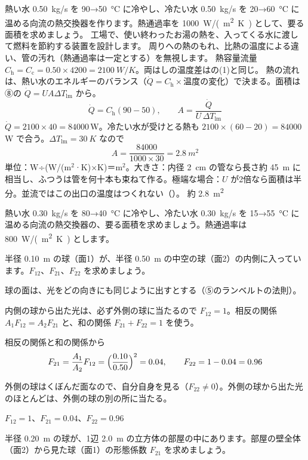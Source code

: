 \begin{phreidai}[熱交換器の面積を決める]
\label{ph:熱-13:ex11}熱い水 \qty{0.50}{kg/s} を 90→\qty{50}{\celsius} に冷やし、冷たい水 \qty{0.50}{kg/s} を 20→\qty{60}{\celsius} に温める向流の熱交換器を作ります。熱通過率を \qty{1000}{W/(m^2.K)} として、要る面積を求めましょう。
\phbamen
工場で、使い終わったお湯の熱を、入ってくる水に渡して燃料を節約する装置を設計します。
\phmushi
周りへの熱のもれ、比熱の温度による違い、管の汚れ（熱通過率は一定とする）を無視します。
\phzu
熱容量流量 $C_{\mathrm h}=C_{\mathrm c}=0.50\times4200=\qty{2100}{W/K}$。両はしの温度差はの(1)と同じ。
\phriyu
熱の流れは、熱い水のエネルギーのバランス（$\dot Q=C_{\mathrm h}\times$温度の変化）で決まる。面積は ⑧の $\dot Q=UA\Delta T_{\mathrm{lm}}$ から。
\phtateru
\[ \dot Q=C_{\mathrm h}(90-50),\qquad A=\frac{\dot Q}{U\,\Delta T_{\mathrm{lm}}} \]
\phtoku
$\dot Q=2100\times40=\num{84000}$\,W。冷たい水が受けとる熱も $2100\times(60-20)=\num{84000}$\,W で合う。$\Delta T_{\mathrm{lm}}=\qty{30}{K}$ なので
\[ A=\frac{\num{84000}}{1000\times30}=\qty{2.8}{m^2} \]
\phtashikame
単位：W÷(W/(m$^2$·K)×K)＝m$^2$。大きさ：内径 \qty{2}{cm} の管なら長さ約 \qty{45}{m} に相当し、ふつうは管を何十本も束ねて作る。極端な場合：$U$ が2倍なら面積は半分。並流ではこの出口の温度はつくれない（）。
\kotae 約 \qty{2.8}{m^2}
\end{phreidai}
\begin{jibun}
熱い水 \qty{0.30}{kg/s} を 80→\qty{40}{\celsius} に冷やし、冷たい水 \qty{0.30}{kg/s} を 15→\qty{55}{\celsius} に温める向流の熱交換器の、要る面積を求めましょう。熱通過率は \qty{800}{W/(m^2.K)} とします。
\end{jibun}

\begin{reidai}
\label{ph:熱-13:ex12}半径 \qty{0.10}{m} の球（面1）が、半径 \qty{0.50}{m} の中空の球（面2）の内側に入っています。$F_{12}$、$F_{21}$、$F_{22}$ を求めましょう。
\par{} 球の面は、光をどの向きにも同じように出すとする（⑤のランベルトの法則）。
\par\kangaekata 内側の球から出た光は、必ず外側の球に当たるので $F_{12}=1$。相反の関係 $A_1F_{12}=A_2F_{21}$ と、和の関係 $F_{21}+F_{22}=1$ を使う。
\par\shiki 相反の関係と和の関係から
\[ F_{21}=\frac{A_1}{A_2}F_{12}=\Bigl(\frac{0.10}{0.50}\Bigr)^2=0.04,\qquad F_{22}=1-0.04=0.96 \]
\par{} 外側の球はくぼんだ面なので、自分自身を見る（$F_{22}\neq0$）。外側の球から出た光のほとんどは、外側の球の別の所に当たる。
\par\kotae $F_{12}=1$、$F_{21}=0.04$、$F_{22}=0.96$
\end{reidai}
\begin{jibun}
半径 \qty{0.20}{m} の球が、1辺 \qty{2.0}{m} の立方体の部屋の中にあります。部屋の壁全体（面2）から見た球（面1）の形態係数 $F_{21}$ を求めましょう。
\end{jibun}

